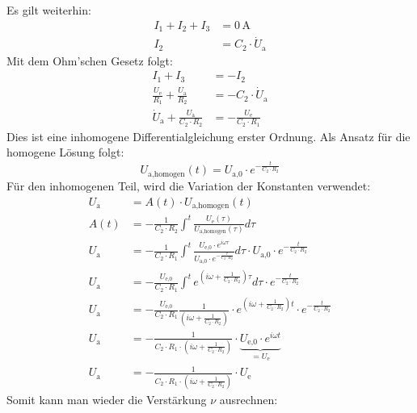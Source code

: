 Es gilt weiterhin:
\begin{align}
    I_1+I_2+I_3&=0\,\text{A}\\
    I_2&=C_2\cdot\dot{U}_\text{a}
\end{align}
Mit dem Ohm'schen Gesetz folgt:
\begin{align}
    I_1+I_3&=-I_2\\
    \frac{U_\text{e}}{R_1}+\frac{U_\text{a}}{R_2}&=-C_2\cdot\dot{U}_\text{a}\\
    \dot{U}_\text{a}+\frac{U_\text{a}}{C_2\cdot R_2}&=-\frac{U_\text{e}}{C_2\cdot R_1}
\end{align}
Dies ist eine inhomogene Differentialgleichung erster Ordnung. Als Ansatz für die homogene Lösung folgt:
\begin{equation}
    U_\text{a,homogen}(t)=U_{\text{a,0}}\cdot e^{-\frac{t}{C_2\cdot R_2}}
\end{equation}
Für den inhomogenen Teil, wird die Variation der Konstanten verwendet:
\begin{align}
    U_\text{a}&=A(t)\cdot U_\text{a,homogen}(t)\\
    A(t)&=-\frac{1}{C_2\cdot R_2}\int^{t}\frac{U_\text{e}(\tau)}{U_\text{a,homogen}(\tau)}d\tau\\
    U_\text{a}&=-\frac{1}{C_2\cdot R_1}\int^{t}\frac{U_\text{e,0}\cdot e^{i\omega \tau}}{U_{\text{a,0}}\cdot  e^{-\frac{\tau}{C_2\cdot R_2}}}d\tau\cdot U_{\text{a,0}}\cdot  e^{-\frac{t}{C_2\cdot R_2}}\\
    U_\text{a}&=-\frac{U_\text{e,0}}{C_2\cdot R_1}\int^{t}e^{\left(i\omega+\frac{1}{C_2\cdot R_2}\right)\tau}d\tau\cdot  e^{-\frac{t}{C_2\cdot R_2}}\\
    U_\text{a}&=-\frac{U_\text{e,0}}{C_2\cdot R_1}\frac{1}{\left(i\omega+\frac{1}{C_2\cdot R_2}\right)}\cdot e^{\left(i\omega+\frac{1}{C_2\cdot R_2}\right)t}\cdot  e^{-\frac{t}{C_2\cdot R_2}}\\
    U_\text{a}&=-\frac{1}{C_2\cdot R_1\cdot\left(i\omega+\frac{1}{C_2\cdot R_2}\right)}\cdot \underbrace{U_\text{e,0}\cdot e^{i\omega t}}_{=U_\text{e}}\\
    U_\text{a}&=-\frac{1}{C_2\cdot R_1\cdot\left(i\omega+\frac{1}{C_2\cdot R_2}\right)}\cdot U_\text{e}
\end{align}
Somit kann man wieder die Verstärkung $\nu$ ausrechnen:
